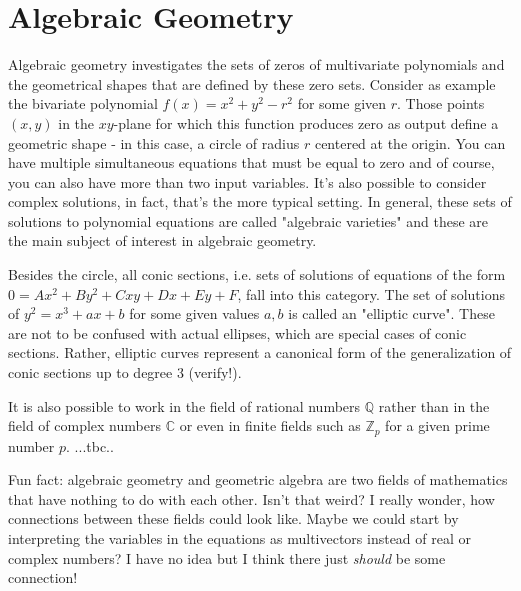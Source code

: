 \section{Algebraic Geometry}
Algebraic geometry investigates the sets of zeros of multivariate polynomials and the geometrical shapes that are defined by these zero sets. Consider as example the bivariate polynomial $f(x) = x^2 + y^2 - r^2$ for some given $r$. Those points $(x,y)$ in the $xy$-plane for which this function produces zero as output define a geometric shape - in this case, a circle of radius $r$ centered at the origin. You can have multiple simultaneous equations that must be equal to zero and of course, you can also have more than two input variables. It's also possible to consider complex solutions, in fact, that's the more typical setting. In general, these sets of solutions to polynomial equations are called "algebraic varieties" and these are the main subject of interest in algebraic geometry.

\medskip
Besides the circle, all conic sections, i.e. sets of solutions of equations of the form $0 = A x^2 + B y^2 + C x y + D x + E y + F$, fall into this category. The set of solutions of $y^2 = x^3 + a x + b$ for some given values $a,b$ is called an "elliptic curve". These are not to be confused with actual ellipses, which are special cases of conic sections. Rather, elliptic curves represent a canonical form of the generalization of conic sections up to degree 3 (verify!).



\medskip
It is also possible to work in the field of rational numbers $\mathbb{Q}$ rather than in the field of complex numbers $\mathbb{C}$ or even in finite fields such as $\mathbb{Z}_p$ for a given prime number $p$. ...tbc..

Fun fact: algebraic geometry and geometric algebra are two fields of mathematics that have nothing to do with each other. Isn't that weird? I really wonder, how connections between these fields could look like. Maybe we could start by interpreting the variables in the equations as multivectors instead of real or complex numbers? I have no idea but I think there just \emph{should} be some connection!


